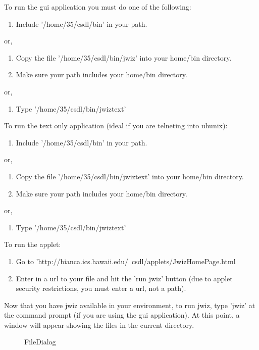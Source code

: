     To run the gui application you must do one of the following:
    \begin{enumerate}
    \item Include '/home/35/csdl/bin' in your path.
    \end{enumerate}
    or, 
    \begin{enumerate}
      \item Copy the file '/home/35/csdl/bin/jwiz' into your home/bin directory.
      \item Make sure your path includes your home/bin directory.
    \end{enumerate}
    or, 
    \begin{enumerate}
    \item Type '/home/35/csdl/bin/jwiztext'
    \end{enumerate}

      To run the text only application (ideal if you are telneting into
      uhunix):
    \begin{enumerate}
    \item Include '/home/35/csdl/bin' in your path.
    \end{enumerate}
    or, 
    \begin{enumerate}
    \item Copy the file '/home/35/csdl/bin/jwiztext' into your home/bin directory.
    \item Make sure your path includes your home/bin directory.
    \end{enumerate}
    or, 
    \begin{enumerate}
    \item Type '/home/35/csdl/bin/jwiztext'
    \end{enumerate}

      To run the applet:
    \begin{enumerate}
    \item Go to 'http://bianca.ics.hawaii.edu/~csdl/applets/JwizHomePage.html
    \item Enter in a url to your file and hit the 'run jwiz' button (due to 
      applet security restrictions, you must enter a url, not a path).
    \end{enumerate}

     Now that you have jwiz available in your environment, to run jwiz,
     type 'jwiz' at the command prompt (if you are using the gui
     application). At this point, a window will appear showing the files in 
     the current directory.

     \begin{figure}[htb] 
       {\centerline{}}
       \caption{\label{HandoutFileDialog} FileDialog}
     \end{figure}

